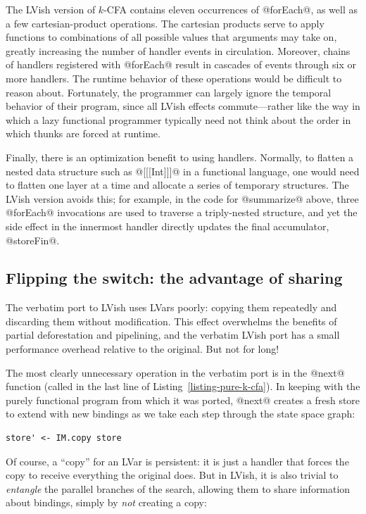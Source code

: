 The LVish version of $k$-CFA contains eleven occurrences of @forEach@,
as well as a few cartesian-product operations.  The cartesian products
serve to apply functions to combinations of all possible values that
arguments may take on, greatly increasing the number of handler events
in circulation.  Moreover, chains of handlers registered with
@forEach@ result in cascades of events through six or more handlers.
The runtime behavior of these operations would be difficult to reason
about.  Fortunately, the programmer can largely ignore the temporal
behavior of their program, since all LVish effects commute---rather
like the way in which a lazy functional programmer typically need not
think about the order in which thunks are forced at runtime.

Finally, there is an optimization benefit to using handlers.
Normally, to flatten a nested data structure such as @[[[Int]]]@ in a
functional language, one would need to flatten one layer at a time and
allocate a series of temporary structures.  The LVish version avoids
this; for example, in the code for @summarize@ above, three @forEach@
invocations are used to traverse a triply-nested structure, and yet
the side effect in the innermost handler directly updates the final
accumulator, @storeFin@.

\subsection{Flipping the switch: the advantage of sharing}

The verbatim port to LVish uses LVars poorly: copying them repeatedly
and discarding them without modification.  This effect overwhelms the
benefits of partial deforestation and pipelining, and the verbatim
LVish port has a small performance overhead relative to the original.
But not for long!

The most clearly unnecessary operation in the verbatim port is in the
@next@ function (called in the last line of
Listing~\ref{listing-pure-k-cfa}).  In keeping with the purely
functional program from which it was ported, @next@ creates a fresh
store to extend with new bindings as we take each step through the
state space graph:

\singlespacing
\begin{lstlisting}
store' <- IM.copy store 
\end{lstlisting}
\doublespacing

\noindent Of course, a ``copy'' for an LVar is persistent: it is just
a handler that forces the copy to receive everything the original
does.  But in LVish, it is also trivial to \emph{entangle} the
parallel branches of the search, allowing them to share information
about bindings, simply by \emph{not} creating a copy:

